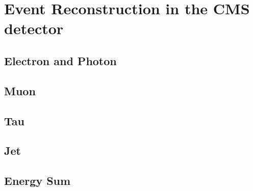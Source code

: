 \chapter{Event Reconstruction in the CMS detector}
\label{chap:Event}

\section{Electron and Photon}
\label{sec:Electron}

\section{Muon}
\label{sec:Muon}

\section{Tau}
\label{sec:Tau}

\section{Jet}
\label{sec:Jet}

\section{Energy Sum}
\label{sec:MET}